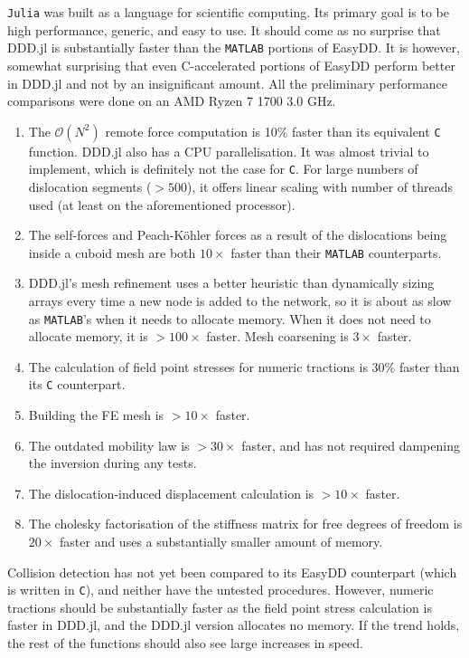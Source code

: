 \texttt{Julia} was built as a language for scientific computing. Its primary goal is to be high performance, generic, and easy to use. It should come as no surprise that DDD.jl is substantially faster than the \texttt{MATLAB} portions of EasyDD. It is however, somewhat surprising that even C-accelerated portions of EasyDD perform better in DDD.jl and not by an insignificant amount. All the preliminary performance comparisons were done on an AMD Ryzen 7 1700 \@ 3.0 GHz.
\begin{enumerate}
    \item The $\mathcal{O}(N^2)$ remote force computation is 10\% faster than its equivalent \texttt{C} function. DDD.jl also has a CPU parallelisation. It was almost trivial to implement, which is definitely not the case for \texttt{C}. For large numbers of dislocation segments ($>500$), it offers linear scaling with number of threads used (at least on the aforementioned processor).
    \item The self-forces and Peach-K\"{o}hler forces as a result of the dislocations being inside a cuboid mesh are both $10\times$ faster than their \texttt{MATLAB} counterparts.
    \item DDD.jl's mesh refinement uses a better heuristic than dynamically sizing arrays every time a new node is added to the network, so it is about as slow as \texttt{MATLAB}'s when it needs to allocate memory. When it does not need to allocate memory, it is $>100\times$ faster. Mesh coarsening is $3\times$ faster.
    \item The calculation of field point stresses for numeric tractions is $30\%$ faster than its \texttt{C} counterpart.
    \item Building the FE mesh is $>10\times$ faster.
    \item The outdated mobility law is $>30\times$ faster, and has not required dampening the inversion during any tests.
    \item The dislocation-induced displacement calculation is $>10\times$ faster.
    \item The cholesky factorisation of the stiffness matrix for free degrees of freedom is $20\times$ faster and uses a substantially smaller amount of memory.
\end{enumerate}
Collision detection has not yet been compared to its EasyDD counterpart (which is written in \texttt{C}), and neither have the untested procedures. However, numeric tractions should be substantially faster as the field point stress calculation is faster in DDD.jl, and the DDD.jl version allocates no memory. If the trend holds, the rest of the functions should also see large increases in speed.

